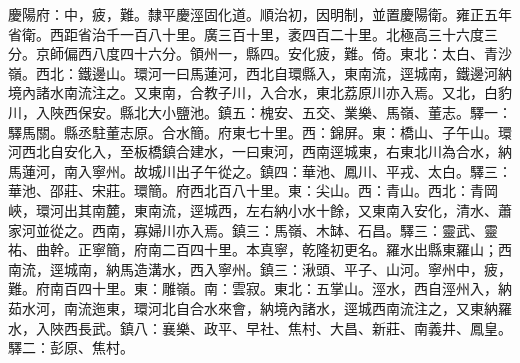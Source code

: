 \begin{pinyinscope}
慶陽府：中，疲，難。隸平慶涇固化道。順治初，因明制，並置慶陽衛。雍正五年省衛。西距省治千一百八十里。廣三百十里，袤四百二十里。北極高三十六度三分。京師偏西八度四十六分。領州一，縣四。安化疲，難。倚。東北：太白、青沙嶺。西北：鐵邊山。環河一曰馬蓮河，西北自環縣入，東南流，逕城南，鐵邊河納境內諸水南流注之。又東南，合教子川，入合水，東北荔原川亦入焉。又北，白豹川，入陜西保安。縣北大小鹽池。鎮五：槐安、五交、業樂、馬嶺、董志。驛一：驛馬關。縣丞駐董志原。合水簡。府東七十里。西：錦屏。東：橋山、子午山。環河西北自安化入，至板橋鎮合建水，一曰東河，西南逕城東，右東北川為合水，納馬蓮河，南入寧州。故城川出子午從之。鎮四：華池、鳳川、平戎、太白。驛三：華池、邵莊、宋莊。環簡。府西北百八十里。東：尖山。西：青山。西北：青岡峽，環河出其南麓，東南流，逕城西，左右納小水十餘，又東南入安化，清水、蕭家河並從之。西南，寡婦川亦入焉。鎮三：馬嶺、木缽、石昌。驛三：靈武、靈祐、曲幹。正寧簡，府南二百四十里。本真寧，乾隆初更名。羅水出縣東羅山；西南流，逕城南，納馬造溝水，西入寧州。鎮三：湫頭、平子、山河。寧州中，疲，難。府南百四十里。東：雕嶺。南：雲寂。東北：五掌山。涇水，西自涇州入，納茹水河，南流迤東，環河北自合水來會，納境內諸水，逕城西南流注之，又東納羅水，入陜西長武。鎮八：襄樂、政平、早社、焦村、大昌、新莊、南義井、鳳皇。驛二：彭原、焦村。


\end{pinyinscope}
